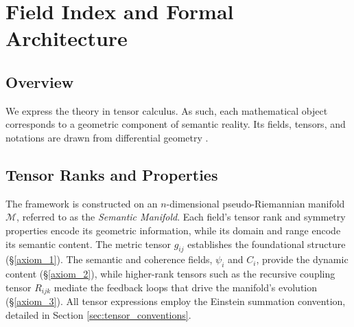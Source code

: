 \chapter{Field Index and Formal Architecture}\label{ch:field_index_and_formal_architecture}

\section{Overview}

We express the theory in tensor calculus. As such, each mathematical object corresponds to a geometric component of semantic reality. Its fields, tensors, and notations are drawn from differential geometry \autocite{Riemann1868, Lee2003}.

\section{Tensor Ranks and Properties}\label{sec:tensor_ranks_and_properties}

The framework is constructed on an \(n\)-dimensional pseudo-Riemannian manifold \(\mathcal{M}\), referred to as the \textit{Semantic Manifold}. Each field's tensor rank and symmetry properties encode its geometric information, while its domain and range encode its semantic content. The metric tensor \(g_{ij}\) establishes the foundational structure (\S\ref{axiom_1}). The semantic and coherence fields, \(\psi_i\) and \(C_i\), provide the dynamic content (\S\ref{axiom_2}), while higher-rank tensors such as the recursive coupling tensor \(R_{ijk}\) mediate the feedback loops that drive the manifold's evolution (\S\ref{axiom_3}). All tensor expressions employ the Einstein summation convention, detailed in Section \ref{sec:tensor_conventions}.

